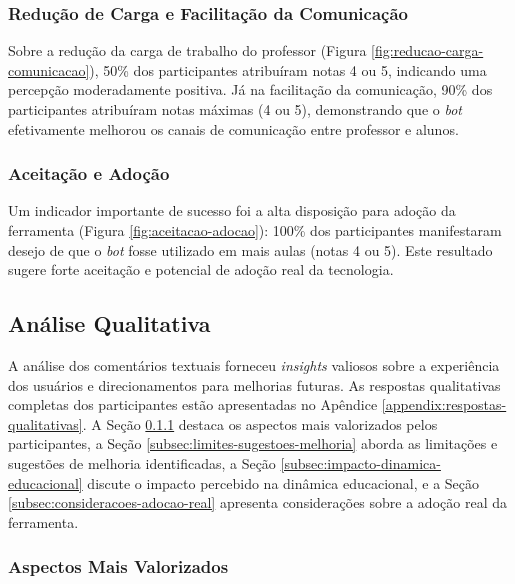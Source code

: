 \subsubsection{Redução de Carga e Facilitação da Comunicação}
\label{subsec:reduz-carga-comunicacao}

Sobre a redução da carga de trabalho do professor (Figura
\ref{fig:reducao-carga-comunicacao}), 50\% dos participantes atribuíram notas 4
ou 5, indicando uma percepção moderadamente positiva. Já na facilitação da
comunicação, 90\% dos participantes atribuíram notas máximas (4 ou 5),
demonstrando que o \textit{bot} efetivamente melhorou os canais de comunicação
entre professor e alunos.

\subsubsection{Aceitação e Adoção}
\label{subsec:aceitacao-adocao}

Um indicador importante de sucesso foi a alta disposição para adoção da
ferramenta (Figura \ref{fig:aceitacao-adocao}): 100\% dos participantes
manifestaram desejo de que o \textit{bot} fosse utilizado em mais aulas (notas 4
ou 5). Este resultado sugere forte aceitação e potencial de adoção real da
tecnologia.

\subsection{Análise Qualitativa}
\label{subsec:analise-qual}

A análise dos comentários textuais forneceu \textit{insights} valiosos sobre a
experiência dos usuários e direcionamentos para melhorias futuras. As respostas
qualitativas completas dos participantes estão apresentadas no Apêndice
\ref{appendix:respostas-qualitativas}. A Seção
\ref{subsec:aspectos-mais-valorizados} destaca os aspectos mais valorizados
pelos participantes, a Seção \ref{subsec:limites-sugestoes-melhoria} aborda as
limitações e sugestões de melhoria identificadas, a Seção
\ref{subsec:impacto-dinamica-educacional} discute o impacto percebido na
dinâmica educacional, e a Seção \ref{subsec:consideracoes-adocao-real} apresenta
considerações sobre a adoção real da ferramenta.

\subsubsection{Aspectos Mais Valorizados}
\label{subsec:aspectos-mais-valorizados}

